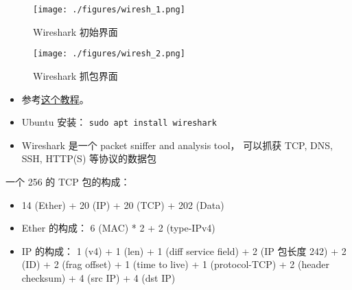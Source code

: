 
\begin{issues}
\issueDraft
\end{issues}

\begin{figure}[ht]
\centering
\texttt{[image: ./figures/wiresh\_1.png]}
\caption{Wireshark 初始界面} \label{wiresh_fig1}
\end{figure}

\begin{figure}[ht]
\centering
\texttt{[image: ./figures/wiresh\_2.png]}
\caption{Wireshark 抓包界面} \label{wiresh_fig2}
\end{figure}


\begin{itemize}
\item 参考\href{https://www.varonis.com/blog/how-to-use-wireshark}{这个教程}。
\item Ubuntu 安装： \verb|sudo apt install wireshark|
\item Wireshark 是一个 packet sniffer and analysis tool， 可以抓获 TCP, DNS, SSH, HTTP(S)   等协议的数据包
\end{itemize}

一个 256 的 TCP 包的构成：
\begin{itemize}
\item 14 (Ether) + 20 (IP) + 20 (TCP) + 202 (Data)
\item Ether 的构成： 6 (MAC) * 2 + 2 (type-IPv4)
\item IP 的构成： 1 (v4) + 1 (len) + 1 (diff service field) + 2 (IP 包长度 242) + 2 (ID) + 2 (frag offset) + 1 (time to live) + 1 (protocol-TCP) + 2 (header checksum) + 4 (src IP) + 4 (dst IP)
\end{itemize}
